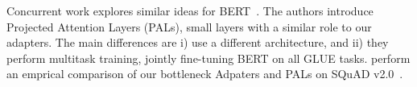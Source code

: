 Concurrent work explores similar ideas for BERT~\citep{stickland2019bert}.
The authors introduce Projected Attention Layers (PALs), small layers with a similar role to our adapters.
The main differences are i) \citet{stickland2019bert} use a different architecture,
and ii) they perform multitask training, jointly fine-tuning BERT on all GLUE tasks.
\citet{semnani2019} perform an emprical comparison of our bottleneck Adpaters and PALs on SQuAD v2.0~\citep{rajpurkar2018}.
